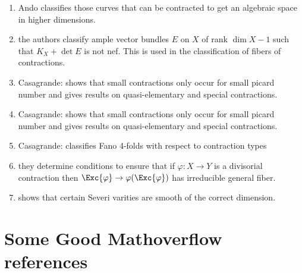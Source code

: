 \documentclass[12pt]{article}
\theoremstyle{plain}
\begin{document}
\begin{enumerate}
\item Ando  classifies those curves that can be contracted to get an algebraic space in higher dimensions.

\item {} the authors classify ample vector bundles $E$ on $X$ of rank $\dim{X} - 1$ such that $K_X + \det{E}$ is not nef. This is used in the classification of fibers of contractions.

\item Casagrande:  shows that small contractions only occur for small picard number and gives results on quasi-elementary and special contractions.

\item Casagrande:  shows that small contractions only occur for small picard number and gives results on quasi-elementary and special contractions.

\item Casagrande:  classifies Fano 4-folds with respect to contraction types 


\item {} they determine conditions to ensure that if $\varphi : X \to Y$ is a divisorial contraction then $\Exc{\varphi} \to \varphi(\Exc{\varphi})$ has irreducible general fiber.

\item {} shows that certain Severi varities are smooth of the correct dimension. 
\end{enumerate}

\section{Some Good Mathoverflow references}
\end{document}
